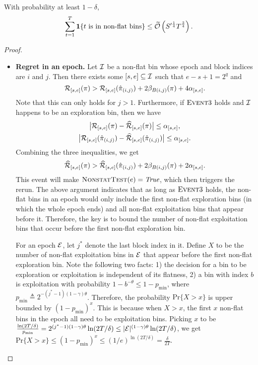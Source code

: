 \begin{lemma}
\label{thm: Ada3 nonflat}
With probability at least $1-\delta$,
\begin{align*}
\sum_{t=1}^T \boldsymbol{1}\{ t \text{ is in non-flat bins} \} \leq \widetilde{\mathcal{O}}\left( S^{\prime \frac{1}{4}} T^{\frac{3}{4}}\right) . 
\end{align*}
\end{lemma}
\begin{proof}
\begin{itemize}[leftmargin=*]
\item \textbf{Regret in an epoch.}
Let ${\mathcal{I}}$ be a non-flat bin whose epoch and block indices are $i$ and $j$. Then there exists some $[s,e]\subseteq {\mathcal{I}}$ such that $e-s+1=2^q$ and 
\begin{equation*}
{\mathcal{R}}_{[s,e]}(\pi)> {\mathcal{R}}_{[s,e]}(\hat{\pi}_{(i,j)}) + 2\beta_{B(i,j)}(\pi)+4\alpha_{[s,e]}.
\end{equation*}
Note that this can only holds for $j>1$. Furthermore, if $\textsc{Event} 3$ holds and ${\mathcal{I}}$ happens to be an exploration bin, then we have 
\begin{gather*}
\big\lvert{\mathcal{R}}_{[s,e]}(\pi)-\widehat{\cal{R}}_{[s,e]}(\pi)\big\rvert\leq \alpha_{[s,e]},\\
\big\lvert{\mathcal{R}}_{[s,e]}(\hat{\pi}_{(i,j)})-\widehat{\cal{R}}_{[s,e]}(\hat{\pi}_{(i,j)})\big\rvert\leq \alpha_{[s,e]}.
\end{gather*}
Combining the three inequalities, we get 
\begin{align*}
\widehat{\cal{R}}_{[s,e]}(\pi)> \widehat{\cal{R}}_{[s,e]}(\hat{\pi}_{(i,j)}) + 2\beta_{B(i,j)}(\pi)+2\alpha_{[s,e]}.
\end{align*}
This event will make $\textsc{NonstatTest}(e)=\textit{True}$, which then triggers the rerun. The above argument indicates that as long as $\textsc{Event} 3$ holds, the non-flat bins in an epoch would only include the first non-flat exploration bins (in which the whole epoch ends) and all non-flat exploitation bins that appear before it. Therefore, the key is to bound the number of non-flat exploitation bins that occur before the first non-flat exploration bin. 

For an epoch ${\mathcal{E}}$, let $j^*$ denote the last block index in it. Define $X$ to be the number of non-flat exploitation bins in ${\mathcal{E}}$ that appear before the first non-flat exploration bin. 
Note the following two facts: 1) the decision for a bin to be exploration or exploitation is independent of its flatness, 2) a bin with index $b$ is exploitation with probability $1-b^{-\theta}\leq 1-p_{\min}$, where $p_{\min}\triangleq 2^{-(j^*-1)(1-\gamma)\theta}$. Therefore, the probability $\text{Pr}\{X> x\}$ is upper bounded by $(1-p_{\min})^x$. This is because when $X>x$, the first $x$ non-flat bins in the epoch all need to be exploitation bins.
%
Picking $x$ to be $\frac{\ln (2T/\delta)}{p_{\min}}=2^{(j^*-1)(1-\gamma)\theta}\ln(2T/\delta)\leq \lvert{\mathcal{E}}\rvert^{(1-\gamma)\theta}\ln(2T/\delta)$, we get  $\text{Pr}\{X> x\}\leq(1-p_{\min})^x \leq (1/e)^{\ln (2T/\delta)}=\frac{\delta}{2T}$. 


\end{itemize}
\end{proof}
